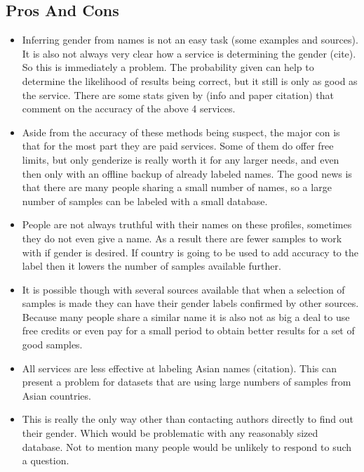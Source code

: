\documentclass{article}
\begin{document}
\subsection{Pros And Cons}
\begin{itemize}
    \item Inferring gender from names is not an easy task (some examples and sources). It is also not always very clear how a service is determining the gender (cite). So this is immediately a problem. The probability given can help to determine the likelihood of results being correct, but it still is only as good as the service. There are some stats given by (info and paper citation) that comment on the accuracy of the above 4 services.

    \item Aside from the accuracy of these methods being suspect, the major con is that for the most part they are paid services. Some of them do offer free limits, but only genderize is really worth it for any larger needs, and even then only with an offline backup of already labeled names. The good news is that there are many people sharing a small number of names, so a large number of samples can be labeled with a small database.

    \item People are not always truthful with their names on these profiles, sometimes they do not even give a name. As a result there are fewer samples to work with if gender is desired. If country is going to be used to add accuracy to the label then it lowers the number of samples available further.

    \item It is possible though with several sources available that when a selection of samples is made they can have their gender labels confirmed by other sources. Because many people share a similar name it is also not as big a deal to use free credits or even pay for a small period to obtain better results for a set of good samples.

    \item All services are less effective at labeling Asian names (citation). This can present a problem for datasets that are using large numbers of samples from Asian countries.

    \item This is really the only way other than contacting authors directly to find out their gender. Which would be problematic with any reasonably sized database. Not to mention many people would be unlikely to respond to such a question.


\end{itemize}
\end{document}
